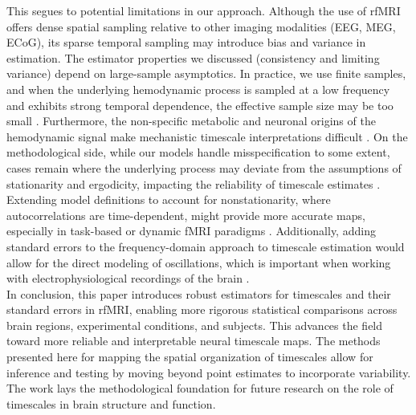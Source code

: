 \documentclass[latex/main.tex]{subfiles}
\begin{document}
This segues to potential limitations in our approach. Although the use of rfMRI offers dense spatial sampling relative to other imaging modalities (EEG, MEG, ECoG), its sparse temporal sampling may introduce bias and variance in estimation. The estimator properties we discussed (consistency and limiting variance) depend on large-sample asymptotics. In practice, we use finite samples, and when the underlying hemodynamic process is sampled at a low frequency and exhibits strong temporal dependence, the effective sample size may be too small \citep{afyouni_effective_2019, kaneoke_variance_2012}. Furthermore, the non-specific metabolic and neuronal origins of the hemodynamic signal make mechanistic timescale interpretations difficult \citep{raut_hierarchical_2020, he_scale-free_2011}. On the methodological side, while our models handle misspecification to some extent, cases remain where the underlying process may deviate from the assumptions of stationarity and ergodicity, impacting the reliability of timescale estimates \citep[chapter~14.7]{hansen_econometrics_2022}. Extending model definitions to account for nonstationarity, where autocorrelations are time-dependent, might provide more accurate maps, especially in task-based or dynamic fMRI paradigms \citep{he_scale-free_2011}. Additionally, adding standard errors to the frequency-domain approach to timescale estimation would allow for the direct modeling of oscillations, which is important when working with electrophysiological recordings of the brain \citep{donoghue_parameterizing_2020, gao_neuronal_2020}.\\

In conclusion, this paper introduces robust estimators for timescales and their standard errors in rfMRI, enabling more rigorous statistical comparisons across brain regions, experimental conditions, and subjects. This advances the field toward more reliable and interpretable neural timescale maps. The methods presented here for mapping the spatial organization of timescales allow for inference and testing by moving beyond point estimates to incorporate variability. The work lays the methodological foundation for future research on the role of timescales in brain structure and function.
\end{document}

